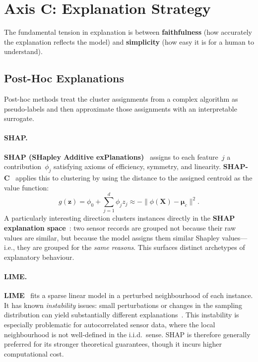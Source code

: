 \documentclass{article}
\theoremstyle{plain}
\theoremstyle{definition}
\theoremstyle{remark}
\begin{document}
\section{Axis C: Explanation Strategy}
\label{sec:explanation}

The fundamental tension in explanation is between \textbf{faithfulness}
(how accurately the explanation reflects the model) and \textbf{simplicity}
(how easy it is for a human to understand).

\subsection{Post-Hoc Explanations}

Post-hoc methods treat the cluster assignments from a complex algorithm
as pseudo-labels and then approximate those assignments with an
interpretable surrogate.

\paragraph{SHAP.}
\textbf{SHAP (SHapley Additive exPlanations)}~\cite{lundberg_unified_2017} assigns
to each feature~$j$ a contribution~$\phi_j$ satisfying axioms of
efficiency, symmetry, and linearity. \textbf{SHAP-C}~\cite{cohen_shapley-based_2024}
applies this to clustering by using the distance to the assigned centroid
as the value function:
\[
  g(\mathbf{z}) = \phi_0 + \textstyle\sum_{j=1}^d \phi_j z_j
  \approx -\|\phi(\mathbf{X}) - \boldsymbol{\mu}_c\|^2.
\]
A particularly interesting direction clusters instances directly in the
\textbf{SHAP explanation space}~\cite{hwang_xclusters_2023}: two sensor records are
grouped not because their raw values are similar, but because the model
assigns them similar Shapley values---i.e., they are grouped for the
\emph{same reasons}. This surfaces distinct archetypes of explanatory
behaviour.

\paragraph{LIME.}
\textbf{LIME}~\cite{ribeiro_why_2016-1} fits a sparse linear model in a
perturbed neighbourhood of each instance. It has known \emph{instability}
issues: small perturbations or changes in the sampling distribution can
yield substantially different explanations~\cite{alvarez-garcia_comprehensive_2024}. This
instability is especially problematic for autocorrelated sensor data,
where the local neighbourhood is not well-defined in the i.i.d.\ sense.
SHAP is therefore generally preferred for its stronger theoretical
guarantees, though it incurs higher computational cost.
\end{document}
